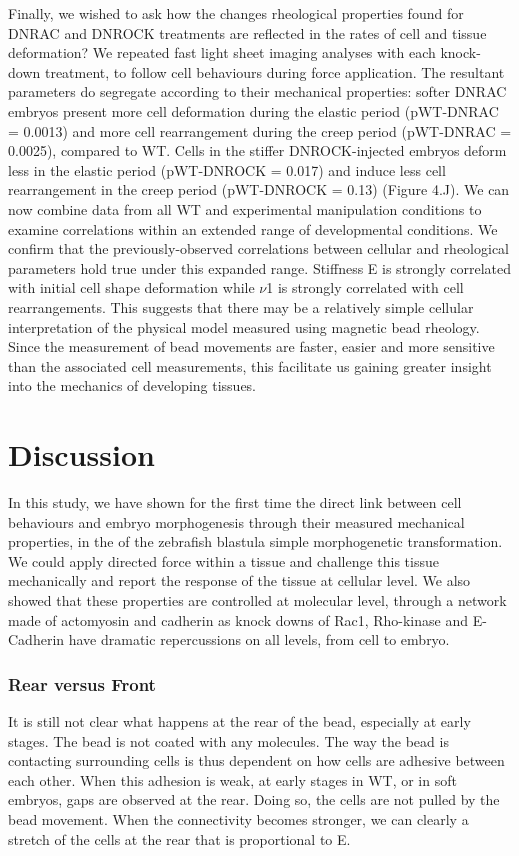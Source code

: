 Finally, we wished to ask how the changes rheological properties found for DNRAC and DNROCK treatments are reflected in the rates of cell and tissue deformation?
We repeated fast light sheet imaging analyses with each knock-down treatment, to follow cell behaviours during force application.
The resultant parameters do segregate according to their mechanical properties: softer DNRAC embryos present more cell deformation during the elastic period (pWT-DNRAC = 0.0013) and more cell rearrangement during the creep period (pWT-DNRAC = 0.0025), compared to WT.
Cells in the stiffer DNROCK-injected embryos deform less in the elastic period (pWT-DNROCK = 0.017) and induce less cell rearrangement in the creep period (pWT-DNROCK = 0.13) (Figure 4.J).
We can now combine data from all WT and experimental manipulation conditions to examine correlations within an extended range of developmental conditions.
We confirm that the previously-observed correlations between cellular and rheological parameters hold true under this expanded range.
Stiffness E is strongly correlated with initial cell shape deformation while $\nu$1 is strongly correlated with cell rearrangements.
This suggests that there may be a relatively simple cellular interpretation of the physical model measured using magnetic bead rheology.
Since the measurement of bead movements are faster, easier and more sensitive than the associated cell measurements, this facilitate us gaining greater insight into the mechanics of developing tissues.
\section{Discussion}
In this study, we have shown for the first time the direct link between cell behaviours and embryo morphogenesis through their measured mechanical properties, in the of the zebrafish blastula simple morphogenetic transformation.
We could apply directed force within a tissue and challenge this tissue mechanically and report the response of the tissue at cellular level.
We also showed that these properties are controlled at molecular level, through a network made of actomyosin and cadherin as knock downs of Rac1, Rho-kinase and E-Cadherin have dramatic repercussions on all levels, from cell to embryo.


\subsubsection{Rear versus Front}
It is still not clear what happens at the rear of the bead, especially at early stages.
The bead is not coated with any molecules.
The way the bead is contacting surrounding cells is thus dependent on how cells are adhesive between each other.
When this adhesion is weak, at early stages in WT, or in soft embryos, gaps are observed at the rear.
Doing so, the cells are not pulled by the bead movement.
When the connectivity becomes stronger, we can clearly a stretch of the cells at the rear that is proportional to E.

